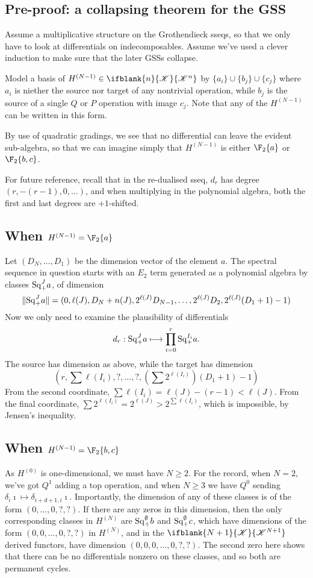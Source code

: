 \documentclass[10pt]{article}
\newcommand{\LL}[1]{\ifblank{#1}{\scrK}{\scrK^{#1}}}
\renewcommand{\Q}{Q}
\newcommand{\SqShift}{\Sq_{\smash{+}}}
\newcommand{\Sq}{\mathrm{Sq}}
\begin{document}
\begin{grothendieck collapse}
\section{Pre-proof: a collapsing theorem for the GSS}
Assume a multiplicative structure on the Grothendieck sseqs, so that we only have to look at differentials on indecomposables. Assume we've used a clever induction to make sure that the later GSSs collapse.

Model a basis of $H^{(N-1)}\in\LL{n}$ by $\{a_i\}\cup \{b_{j}\}\cup \{c_{j}\}$ where $a_i$ is niether the source nor target of any nontrivial operation, while $b_{j}$ is the source of a single $\Q$ or $P$ operation with image $c_j$. Note that any of the $H^{(N-1)}$ can be written in this form.

By use of quadratic gradings, we see that no differential can leave the evident sub-algebra, so that we can imagine simply that $H^{(N-1)}$ is either $\F_2\{a\}$ or $\F_2\{b,c\}$.

For future reference, recall that in the re-dualised sseq, $d_r$ has degree $(r,-(r-1),0,\ldots)$, and when multiplying in the polynomial algebra, both the first and last degrees are $+1$-shifted.
\subsection{When $H^{(N-1)}=\F_2\{a\}$}
Let $(D_N,\ldots,D_1)$ be the dimension vector of the element $a$.
The spectral sequence in question starts with an $E_2$ term generated as a polynomial algebra by classes $\SqShift^Ja$, of dimension
\[\|\SqShift^Ja\|=(0,\ell(J),D_N+n(J),2^{\ell(J)}D_{N-1},\ldots,2^{\ell(J)}D_{2},2^{\ell(J)}(D_{1}+1)-1)\]
Now we only need to examine the plausibility of differentials
\[d_r:\SqShift^Ja\mapsto \prod_{i=0}^r\SqShift^{I_i}a.\]
The source has dimension as above, while the target has dimension
\[(r,\textstyle\sum\ell(I_i),?,\ldots,?,(\textstyle\sum2^{\ell(I_i)})(D_{1}+1)-1)\]
From the second coordinate, $\sum\ell(I_i)=\ell(J)-(r-1)<\ell(J)$. From the final coordinate, $\sum2^{\ell(I_i)}=2^{\ell(J)}>2^{\sum\ell(I_i)}$, which is impossible, by Jensen's inequality.
\subsection{When $H^{(N-1)}=\F_2\{b,c\}$}
As $H^{(0)}$ is one-dimensional, we must have $N\geq2$. For the record, when $N=2$, we've got $Q^1$ adding a top operation, and when $N\geq3$ we have $Q^0$ sending $\delta_{i}\imath\mapsto \delta_{i+d+1,i}\imath$. Importantly, the dimension of any of these classes is of the form $(0,\ldots,0,?,?)$. If there are any zeros in this dimension, then the only corresponding classes in $H^{(N)}$ are $\SqShift^{\emptyset}b$ and $\SqShift^{\emptyset}c$, which have dimensions of the form $(0,0,\ldots,0,?,?)$ in $H^{(N)}$, and in the $\LL{N+1}$ derived functors, have dimension $(0,0,0,\ldots,0,?,?)$. The second zero here shows that there can be no differentials nonzero on these classes, and so both are permanent cycles.


\end{grothendieck collapse}
\end{document}
